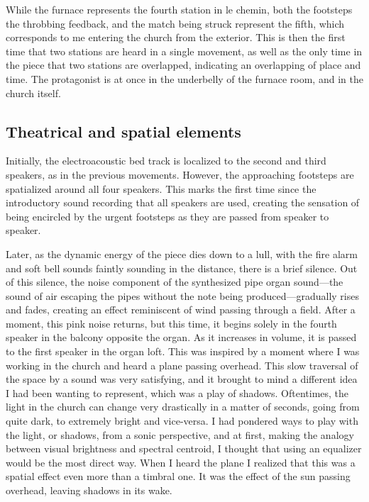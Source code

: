 \documentclass[12pt,twoside,maitrise]{dms_ks}
\theoremstyle{definition}
\begin{document}
While the furnace represents the fourth station in le chemin, both the footsteps the throbbing feedback, and the match being struck represent the fifth, which corresponds to me entering the church from the exterior. 
This is then the first time that two stations are heard in a single movement, as well as the only time in the piece that two stations are overlapped, indicating an overlapping of place and time. 
The protagonist is at once in the underbelly of the furnace room, and in the church itself. 


\subsection{Theatrical and spatial elements}

Initially, the electroacoustic bed track is localized to the second and third speakers, as in the previous movements. 
However, the approaching footsteps are spatialized around all four speakers. 
This marks the first time since the introductory sound recording that all speakers are used, creating the sensation of being encircled by the urgent footsteps as they are passed from speaker to speaker.

Later, as the dynamic energy of the piece dies down to a lull, with the fire alarm and soft bell sounds faintly sounding in the distance, there is a brief silence. 
Out of this silence, the noise component of the synthesized pipe organ sound---the sound of air escaping the pipes without the note being produced---gradually rises and fades, creating an effect reminiscent of wind passing through a field. 
After a moment, this pink noise returns, but this time, it begins solely in the fourth speaker in the balcony opposite the organ. 
As it increases in volume, it is passed to the first speaker in the organ loft. 
This was inspired by a moment where I was working in the church and heard a plane passing overhead. 
This slow traversal of the space by a sound was very satisfying, and it brought to mind a different idea I had been wanting to represent, which was a play of shadows. 
Oftentimes, the light in the church can change very drastically in a matter of seconds, going from quite dark, to extremely bright and vice-versa. 
I had pondered ways to play with the light, or shadows, from a sonic perspective, and at first, making the analogy between visual brightness and spectral centroid, I thought that using an equalizer would be the most direct way. 
When I heard the plane I realized that this was a spatial effect even more than a timbral one. 
It was the effect of the sun passing overhead, leaving shadows in its wake.
\end{document}
